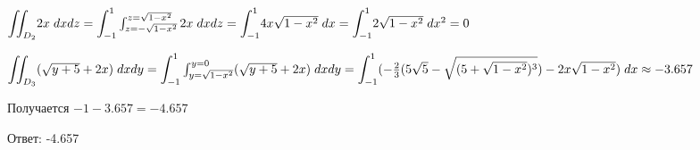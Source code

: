 \begin{enumerate}
    ${\displaystyle \iint_{D_2}}2x \hspace{1mm}dxdz = {\displaystyle \int_{-1}^{1}}\int_{z = -\sqrt{1 - x^2}}^{z = \sqrt{1 - x^2}}2x \hspace{1mm} dx dz = {\displaystyle \int_{-1}^{1}}4x\sqrt{1 - x^2} \hspace{1mm} dx= {\displaystyle \int_{-1}^{1}}2\sqrt{1 - x^2} \hspace{1mm} dx^2 = 0\\$

    ${\displaystyle \iint_{D_3}}(\sqrt{y  +5} + 2x )\hspace{1mm} dxdy = {\displaystyle \int_{-1}^{1}}\int_{y = \sqrt{1 - x^2}}^{y = 0}(\sqrt{y + 5} + 2x) \hspace{1mm} dx dy = {\displaystyle \int_{-1}^{1}}(-\frac{2}{3}(5\sqrt{5} - \sqrt{(5 + \sqrt{1 - x^2})^3})  -2x\sqrt{1 - x^2} )\hspace{1mm} dx \approx -3.657\\$

    Получается $-1 - 3.657 = -4.657$

    Ответ: -4.657

\end{enumerate}

\clearpage
